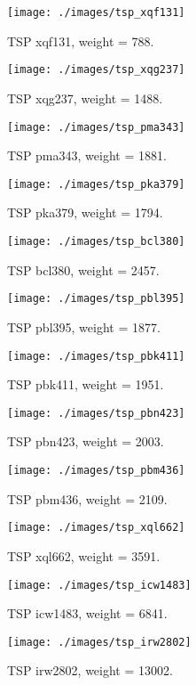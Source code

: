 \documentclass[a4paper, 12pt]{article}
\begin{document}
\begin{figure}[h]
  \texttt{[image: ./images/tsp\_xqf131]}
  \caption{TSP xqf131, weight = 788.}
  \label{fig:tsp_xqf131}
\end{figure}
\begin{figure}[h]
  \texttt{[image: ./images/tsp\_xqg237]}
  \caption{TSP xqg237, weight = 1488.}
  \label{fig:tsp_xqg237}
\end{figure}
\begin{figure}[h]
  \texttt{[image: ./images/tsp\_pma343]}
  \caption{TSP pma343, weight = 1881.}
  \label{fig:tsp_pma343}
\end{figure}
\begin{figure}[h]
  \texttt{[image: ./images/tsp\_pka379]}
  \caption{TSP pka379, weight = 1794.}
  \label{fig:tsp_pka379}
\end{figure}
\begin{figure}[h]
  \texttt{[image: ./images/tsp\_bcl380]}
  \caption{TSP bcl380, weight = 2457.}
  \label{fig:tsp_bcl380}
\end{figure}
\begin{figure}[h]
  \texttt{[image: ./images/tsp\_pbl395]}
  \caption{TSP pbl395, weight = 1877.}
  \label{fig:tsp_pbl395}
\end{figure}
\begin{figure}[h]
  \texttt{[image: ./images/tsp\_pbk411]}
  \caption{TSP pbk411, weight = 1951.}
  \label{fig:tsp_pbk411}
\end{figure}
\begin{figure}[h]
  \texttt{[image: ./images/tsp\_pbn423]}
  \caption{TSP pbn423, weight = 2003.}
  \label{fig:tsp_pbn423}
\end{figure}
\begin{figure}[h]
  \texttt{[image: ./images/tsp\_pbm436]}
  \caption{TSP pbm436, weight = 2109.}
  \label{fig:tsp_pbm436}
\end{figure}
\begin{figure}[h]
  \texttt{[image: ./images/tsp\_xql662]}
  \caption{TSP xql662, weight = 3591.}
  \label{fig:tsp_xql662}
\end{figure}
\begin{figure}[h]
  \texttt{[image: ./images/tsp\_icw1483]}
  \caption{TSP icw1483, weight = 6841.}
  \label{fig:tsp_icw1483}
\end{figure}
\begin{figure}[h]
  \texttt{[image: ./images/tsp\_irw2802]}
  \caption{TSP irw2802, weight = 13002.}
  \label{fig:tsp_irw2802}
\end{figure}
\end{document}

